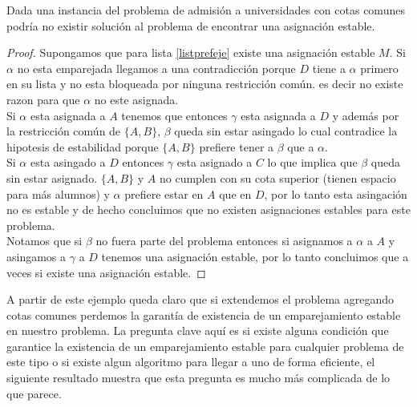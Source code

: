 \begin{teo} \cite{Todo}
\label{ejemplo teorema}
Dada una instancia del problema de admisión a universidades con cotas comunes podría no existir solución al problema de encontrar una asignación estable.
\end{teo}
\begin{proof}
Supongamos que para lista \ref{listprefeje} existe una asignación estable $M$. Si $\alpha$ no esta emparejada llegamos a una contradicción porque $D$ tiene a $\alpha$ primero en su lista y no esta bloqueada por ninguna restricción común. es decir no existe razon para que $\alpha$ no este asignada. \\ Si $\alpha$ esta asignada a $A$ tenemos que entonces $\gamma$ esta asignada a $D$ y además  por la restricción común de $\{A,B\}$, $\beta$ queda sin estar asingado lo cual contradice la hipotesis de estabilidad porque $\{A,B\}$ prefiere tener a $\beta$ que a $\alpha$. \\ Si $\alpha$ esta asingado a $D$ entonces $\gamma$ esta asignado a $C$ lo que implica que $\beta$ queda sin estar asignado. $\{A,B\}$ y $A$ no cumplen con su cota superior (tienen espacio para más alumnos) y $\alpha$ prefiere estar en $A$ que en $D$, por lo tanto esta asingación no es estable y de hecho concluimos que no existen asignaciones estables para este problema. \\
Notamos que si $\beta$ no fuera parte del problema entonces si asignamos a $\alpha$ a $A$ y asingamos a $\gamma$ a $D$ tenemos una asignación estable, por lo tanto concluimos que a veces si existe una asignación estable. 
\end{proof}


A partir de este ejemplo queda claro que si extendemos el problema agregando cotas comunes perdemos la garantía de existencia de un emparejamiento estable en nuestro problema. La pregunta clave aquí es si existe alguna condición que garantice la existencia de un emparejamiento estable para cualquier problema de este tipo o si existe algun algoritmo para llegar a uno de forma eficiente, el siguiente resultado muestra que esta pregunta es mucho más complicada de lo que parece. 

